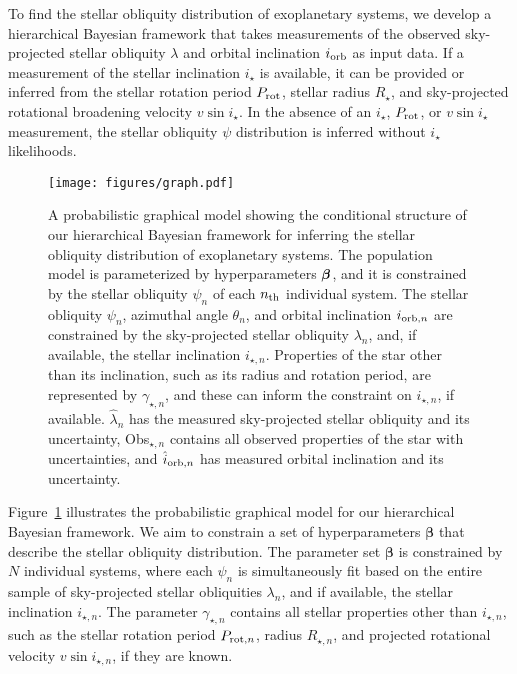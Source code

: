 \documentclass[twocolumn,times,linenumbers]{aastex631}
\begin{document}
To find the stellar obliquity distribution of exoplanetary systems, we develop a hierarchical Bayesian framework that takes measurements of the observed sky-projected stellar obliquity $\lambda$ and orbital inclination $i_{\rm orb}$ as input data.
If a measurement of the stellar inclination $i_\star$ is available, it can be provided or inferred from the stellar rotation period $P_{\rm rot}$, stellar radius $R_\star$, and sky-projected rotational broadening velocity $v\sin{i}_\star$.
In the absence of an $i_\star$, $P_{\rm rot}$, or $v\sin{i}_\star$ measurement, the stellar obliquity $\psi$ distribution is inferred without $i_\star$ likelihoods.

\begin{figure}[ht!]
    \centering
    \texttt{[image: figures/graph.pdf]}
    \caption{A probabilistic graphical model showing the conditional structure of our hierarchical Bayesian framework for inferring the stellar obliquity distribution of exoplanetary systems. The population model is parameterized by hyperparameters $\vb*{\beta}$, and it is constrained by the stellar obliquity $\psi_n$ of each $n_{\rm th}$ individual system. The stellar obliquity $\psi_n$, azimuthal angle $\theta_n$, and orbital inclination $i_{{\rm orb}, n}$ are constrained by the sky-projected stellar obliquity $\lambda_n$, and, if available, the stellar inclination $i_{\star, n}$.
    Properties of the star other than its inclination, such as its radius and rotation period, are represented by $\gamma_{\star, n}$, and these can inform the constraint on $i_{\star, n}$, if available. 
    $\hat{\lambda}_n$ has the measured sky-projected stellar obliquity and its uncertainty, Obs$_{\star,n}$ contains all observed properties of the star with uncertainties, and $\hat{i}_{{\rm orb}, n}$ has measured orbital inclination and its uncertainty.}
    \label{fig:graph}
\end{figure}

Figure~\ref{fig:graph} illustrates the probabilistic graphical model for our hierarchical Bayesian framework. We aim to constrain a set of hyperparameters $\bm{\beta}$ that describe the stellar obliquity distribution. The parameter set $\bm{\beta}$ is constrained by $N$ individual systems, where each $\psi_n$ is simultaneously fit based on the entire sample of sky-projected stellar obliquities $\lambda_n$, and if available, the stellar inclination $i_{\star, n}$. 
The parameter $\gamma_{\star, n}$ contains all stellar properties other than $i_{\star,n}$, such as the stellar rotation period $P_{{\rm rot},n}$, radius $R_{\star,n}$, and projected rotational velocity $v\sin{i_{\star,n}}$, if they are known.
\end{document}
